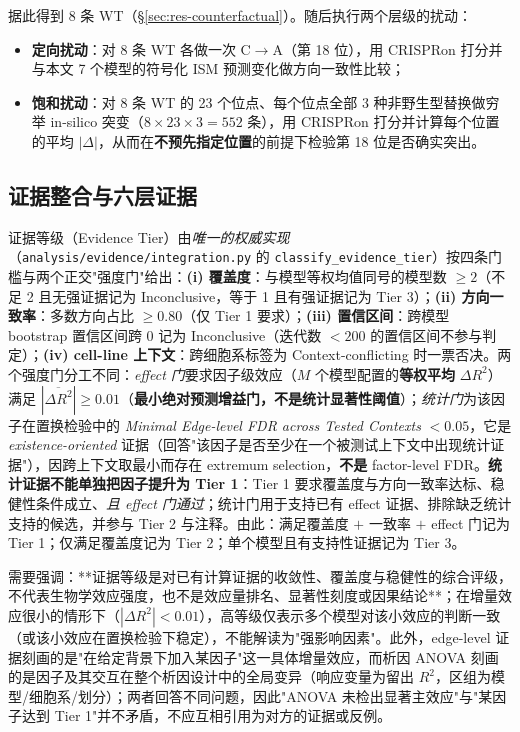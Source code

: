 据此得到 8 条 WT（\S\ref{sec:res-counterfactual}）。随后执行两个层级的扰动：

\begin{itemize}
\item \textbf{定向扰动}：对 8 条 WT 各做一次 C$\rightarrow$A（第 18 位），用 CRISPRon 打分并与本文 7 个模型的符号化 ISM 预测变化做方向一致性比较；
\item \textbf{饱和扰动}：对 8 条 WT 的 23 个位点、每个位点全部 3 种非野生型替换做穷举 in-silico 突变（$8\times23\times3=552$ 条），用 CRISPRon 打分并计算每个位置的平均 $|\Delta|$，从而在\textbf{不预先指定位置}的前提下检验第 18 位是否确实突出。
\end{itemize}

\subsection{证据整合与六层证据}
\label{sec:methods-evidence}

证据等级（Evidence Tier）由\emph{唯一的权威实现}（\texttt{analysis/evidence/integration.py} 的 \texttt{classify\_evidence\_tier}）按四条门槛与两个正交"强度门"给出：\textbf{(i) 覆盖度}：与模型等权均值同号的模型数 $\ge 2$（不足 2 且无强证据记为 Inconclusive，等于 1 且有强证据记为 Tier 3）；\textbf{(ii) 方向一致率}：多数方向占比 $\ge 0.80$（仅 Tier 1 要求）；\textbf{(iii) 置信区间}：跨模型 bootstrap 置信区间跨 0 记为 Inconclusive（迭代数 $<200$ 的置信区间不参与判定）；\textbf{(iv) cell-line 上下文}：跨细胞系标签为 Context-conflicting 时一票否决。两个强度门分工不同：\emph{effect 门}要求因子级效应（$M$ 个模型配置的\textbf{等权平均} $\Delta R^{2}$）满足 $|\overline{\Delta R^{2}}| \ge 0.01$（\textbf{最小绝对预测增益门，不是统计显著性阈值}）；\emph{统计门}为该因子在置换检验中的 \emph{Minimal Edge-level FDR across Tested Contexts} $<0.05$，它是 \emph{existence-oriented} 证据（回答"该因子是否至少在一个被测试上下文中出现统计证据"），因跨上下文取最小而存在 extremum selection，\textbf{不是} factor-level FDR。\textbf{统计证据不能单独把因子提升为 Tier 1}：Tier 1 要求覆盖度与方向一致率达标、稳健性条件成立、\emph{且 effect 门通过}；统计门用于支持已有 effect 证据、排除缺乏统计支持的候选，并参与 Tier 2 与注释。由此：满足覆盖度 $+$ 一致率 $+$ effect 门记为 Tier 1；仅满足覆盖度记为 Tier 2；单个模型且有支持性证据记为 Tier 3。

需要强调：**证据等级是对已有计算证据的收敛性、覆盖度与稳健性的综合评级，不代表生物学效应强度，也不是效应量排名、显著性刻度或因果结论**；在增量效应很小的情形下（$|\Delta R^{2}|<0.01$），高等级仅表示多个模型对该小效应的判断一致（或该小效应在置换检验下稳定），不能解读为"强影响因素"。此外，edge-level 证据刻画的是"在给定背景下加入某因子"这一具体增量效应，而析因 ANOVA 刻画的是因子及其交互在整个析因设计中的全局变异（响应变量为留出 $R^{2}$，区组为模型/细胞系/划分）；两者回答不同问题，因此"ANOVA 未检出显著主效应"与"某因子达到 Tier 1"并不矛盾，不应互相引用为对方的证据或反例。

